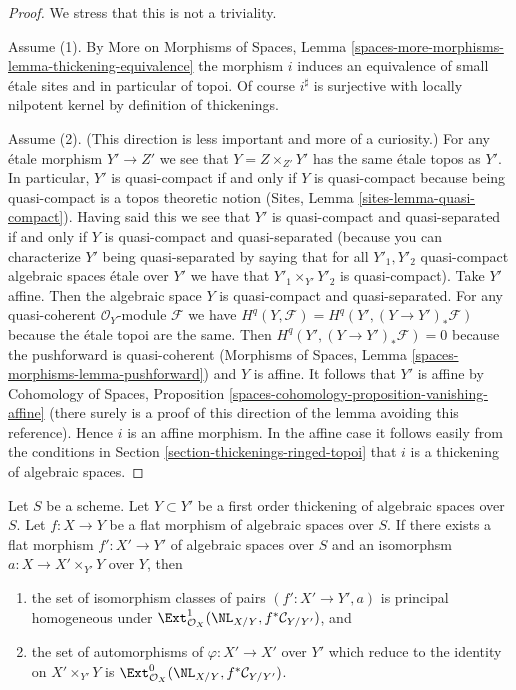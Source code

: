 \begin{proof}
We stress that this is not a triviality.

\medskip\noindent
Assume (1). By More on Morphisms of Spaces, Lemma
\ref{spaces-more-morphisms-lemma-thickening-equivalence}
the morphism $i$ induces an equivalence of small \'etale
sites and in particular of topoi. Of course $i^\sharp$
is surjective with locally nilpotent kernel by definition
of thickenings.

\medskip\noindent
Assume (2). (This direction is less important and more of
a curiosity.) For any \'etale morphism $Y' \to Z'$ we see
that $Y = Z \times_{Z'} Y'$ has the same \'etale topos
as $Y'$. In particular, $Y'$ is quasi-compact if and only if
$Y$ is quasi-compact because being quasi-compact
is a topos theoretic notion (Sites, Lemma \ref{sites-lemma-quasi-compact}).
Having said this we see that $Y'$ is quasi-compact and quasi-separated
if and only if $Y$ is quasi-compact and quasi-separated
(because you can characterize $Y'$ being quasi-separated by saying
that for all $Y'_1, Y'_2$ quasi-compact algebraic spaces \'etale over $Y'$
we have that $Y'_1 \times_{Y'} Y'_2$ is quasi-compact).
Take $Y'$ affine. Then the algebraic space $Y$ is
quasi-compact and quasi-separated. For any
quasi-coherent $\mathcal{O}_Y$-module $\mathcal{F}$ we have
$H^q(Y, \mathcal{F}) = H^q(Y', (Y \to Y')_*\mathcal{F})$
because the \'etale topoi are the same.
Then $H^q(Y', (Y \to Y')_*\mathcal{F}) = 0$
because the pushforward is quasi-coherent
(Morphisms of Spaces, Lemma \ref{spaces-morphisms-lemma-pushforward})
and $Y$ is affine. It follows that $Y'$ is affine by
Cohomology of Spaces, Proposition
\ref{spaces-cohomology-proposition-vanishing-affine}
(there surely is a proof of this direction of the lemma
avoiding this reference).
Hence $i$ is an affine morphism. In the affine case it
follows easily from the conditions in
Section \ref{section-thickenings-ringed-topoi}
that $i$ is a thickening of algebraic spaces.
\end{proof}

\begin{lemma}
\label{lemma-deform-spaces}
Let $S$ be a scheme.
Let $Y \subset Y'$ be a first order thickening of algebraic spaces
over $S$.
Let $f : X \to Y$ be a flat morphism of algebraic spaces over $S$.
If there exists a flat morphism $f' : X' \to Y'$ of algebraic spaces over $S$
and an isomorphsm $a : X \to X' \times_{Y'} Y$ over $Y$, then
\begin{enumerate}
\item the set of isomorphism classes of pairs $(f' : X' \to Y', a)$ is
principal homogeneous under
$\Ext^1_{\mathcal{O}_X}(\NL_{X/Y}, f^*\mathcal{C}_{Y/Y'})$, and
\item the set of automorphisms of $\varphi : X' \to X'$
over $Y'$ which reduce to the identity on $X' \times_{Y'} Y$
is $\Ext^0_{\mathcal{O}_X}(\NL_{X/Y}, f^*\mathcal{C}_{Y/Y'})$.
\end{enumerate}
\end{lemma}

